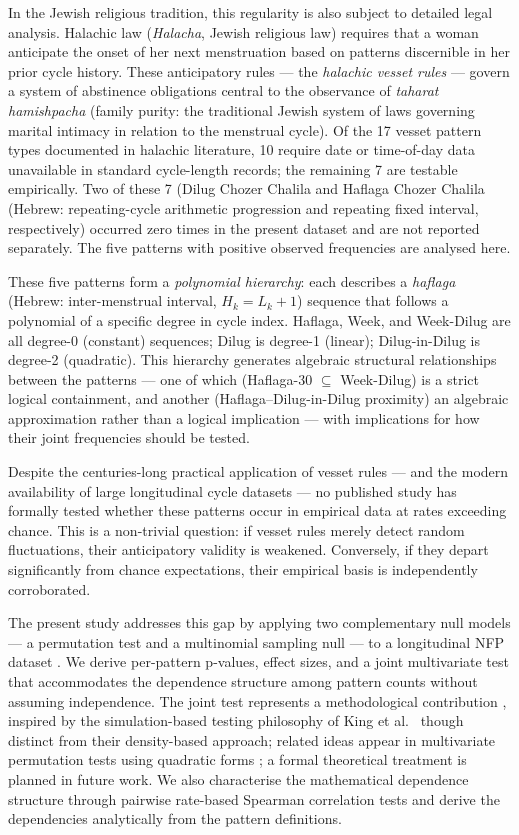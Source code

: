 \documentclass[12pt]{article}
\begin{document}
In the Jewish religious tradition, this regularity is also subject to detailed legal
analysis. Halachic law (\textit{Halacha}, Jewish religious law) requires that a woman anticipate the onset of
her next menstruation based on patterns discernible in her prior cycle history. These
anticipatory rules --- the \textit{halachic vesset rules} --- govern a system of abstinence
obligations central to the observance of \textit{taharat hamishpacha} (family purity: the traditional Jewish
system of laws governing marital intimacy in relation to the menstrual cycle). Of the 17 vesset pattern types documented in halachic literature, 10 require
date or time-of-day data unavailable in standard cycle-length records; the remaining
7 are testable empirically. Two of these 7 (Dilug Chozer Chalila and Haflaga Chozer Chalila
(Hebrew: repeating-cycle arithmetic progression and repeating fixed interval,
respectively) occurred zero times in the present dataset and are not reported separately.
The five patterns with positive observed frequencies are analysed here.

These five patterns form a \textit{polynomial hierarchy}: each describes a \textit{haflaga} (Hebrew: inter-menstrual interval, $H_k = L_k + 1$)
sequence that follows a polynomial of a specific degree in cycle index. Haflaga,
Week, and Week-Dilug are all degree-0 (constant) sequences; Dilug is degree-1
(linear); Dilug-in-Dilug is degree-2 (quadratic). This hierarchy generates
algebraic structural relationships between the patterns --- one of which
(Haflaga-30 $\subseteq$ Week-Dilug) is a strict logical containment, and
another (Haflaga--Dilug-in-Dilug proximity) an algebraic approximation rather
than a logical implication --- with implications for how their joint frequencies
should be tested.

Despite the centuries-long practical application of vesset rules --- and the modern
availability of large longitudinal cycle datasets --- no published study has formally
tested whether these patterns occur in empirical data at rates exceeding chance. This
is a non-trivial question: if vesset rules merely detect random fluctuations, their
anticipatory validity is weakened. Conversely, if they depart significantly from chance expectations,
their empirical basis is independently corroborated.

The present study addresses this gap by applying two complementary null models ---
a permutation test \cite{edgington2007} and a multinomial sampling null
\cite{anon2022phd} --- to a longitudinal NFP dataset \cite{fehring2013}. We derive
per-pattern p-values, effect sizes, and a joint multivariate test that accommodates
the dependence structure among pattern counts without assuming independence. The joint
test represents a methodological contribution \cite{anon2022phd}, inspired by the
simulation-based testing philosophy of King et al.\ \cite{king2018} though distinct
from their density-based approach; related ideas appear in multivariate permutation
tests using quadratic forms \cite{pesarin2010}; a formal theoretical treatment is
planned in future work. We also characterise the mathematical dependence structure through pairwise
rate-based Spearman correlation tests and derive the dependencies analytically from the pattern definitions.
\end{document}
